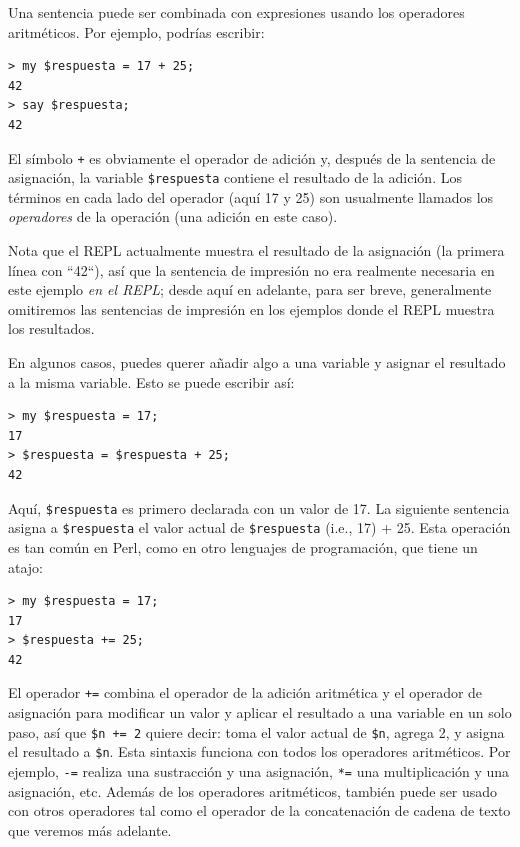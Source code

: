 Una sentencia puede ser combinada con expresiones usando los operadores
aritméticos. Por ejemplo, podrías escribir:

\begin{lstlisting}
> my $respuesta = 17 + 25;
42
> say $respuesta;
42
\end{lstlisting}
%

El símbolo \verb'+' es obviamente el operador de adición y,
después de la sentencia de asignación, la variable \verb'$respuesta'
contiene el resultado de la adición. Los términos en cada lado del operador
(aquí 17 y 25) son usualmente llamados los \emph{operadores}
de la operación (una adición en este caso).

Nota que el REPL actualmente muestra el resultado de la asignación
(la primera línea con ``42``), así que la sentencia de impresión 
no era realmente necesaria en este ejemplo \emph{en el REPL};
desde aquí en adelante, para ser breve, generalmente omitiremos las sentencias
de impresión en los ejemplos donde el REPL muestra los resultados.

En algunos casos, puedes querer añadir algo a una variable y 
asignar el resultado a la misma variable. Esto se puede escribir
así:

\begin{lstlisting}
> my $respuesta = 17;
17
> $respuesta = $respuesta + 25;
42
\end{lstlisting}
%

Aquí, \verb"$respuesta" es primero declarada con un valor de 17. La siguiente sentencia
asigna a  \verb"$respuesta" el valor actual de  \verb"$respuesta" (i.e., 17) + 25.
Esta operación es tan común en Perl, como en otro lenguajes de programación, que tiene
un atajo:

\begin{lstlisting}
> my $respuesta = 17;
17
> $respuesta += 25;
42
\end{lstlisting}
%

El operador \verb"+=" combina el operador de la adición aritmética 
y el operador de asignación para modificar un valor y aplicar 
el resultado a una variable en un solo paso, así que 
\verb"$n += 2" quiere decir: toma el valor actual de \verb|$n|, agrega
2, y asigna el resultado a \verb|$n|. Esta sintaxis funciona con todos
los operadores aritméticos. Por ejemplo, \verb|-=| realiza una
sustracción y una asignación, \verb|*=| una multiplicación y una asignación, etc.
Además de los operadores aritméticos, también puede ser usado con otros operadores 
tal como el operador de la concatenación de cadena de texto que veremos
más adelante.


